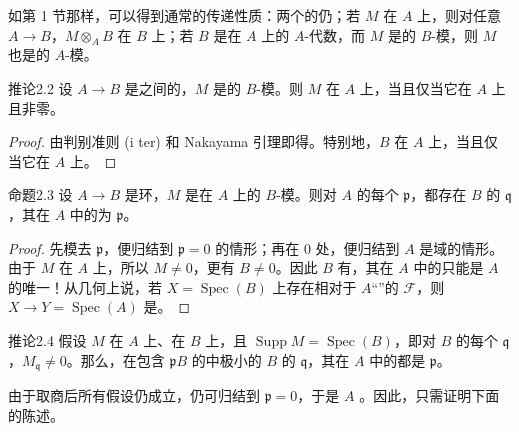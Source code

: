 如第 1 节那样，可以得到通常的传递性质：两个的仍；若 $M$ 在 $A$ 上，则对任意 $A\to B$，$M\otimes_A B$ 在 $B$ 上；若 $B$ 是在 $A$ 上的 $A$-代数，而 $M$ 是的 $B$-模，则 $M$ 也是的 $A$-模。

\begin{SGAresult}{推论}{2.2}
设 $A\to B$ 是之间的，$M$ 是的 $B$-模。则 $M$ 在 $A$ 上，当且仅当它在 $A$ 上且非零。
\end{SGAresult}
\begin{proof}
由判别准则 (i ter) 和 Nakayama 引理即得。特别地，$B$ 在 $A$ 上，当且仅当它在 $A$ 上。
\end{proof}

\begin{SGAresult}{命题}{2.3}
设 $A\to B$ 是环，$M$ 是在 $A$ 上的 $B$-模。则对 $A$ 的每个 $\mathfrak p$，都存在 $B$ 的 $\mathfrak q$，其在 $A$ 中的为 $\mathfrak p$。
\end{SGAresult}
\begin{proof}
先模去 $\mathfrak p$，便归结到 $\mathfrak p=0$ 的情形；再在 $0$ 处，便归结到 $A$ 是域的情形。由于 $M$ 在 $A$ 上，所以 $M\ne0$，更有 $B\ne0$。因此 $B$ 有，其在 $A$ 中的只能是 $A$ 的唯一！从几何上说，若 $X=\operatorname{Spec}(B)$ 上存在相对于 $A$“”的 $\mathcal F$，则 $X\to Y=\operatorname{Spec}(A)$ 是。
\end{proof}

\begin{SGAresult}{推论}{2.4}
假设 $M$ 在 $A$ 上、在 $B$ 上，且 $\operatorname{Supp}M=\operatorname{Spec}(B)$，即对 $B$ 的每个 $\mathfrak q$，$M_{\mathfrak q}\ne0$。那么，在包含 $\mathfrak pB$ 的中极小的 $B$ 的 $\mathfrak q$，其在 $A$ 中的都是 $\mathfrak p$。
\end{SGAresult}
由于取商后所有假设仍成立，仍可归结到 $\mathfrak p=0$，于是 $A$ 。因此，只需证明下面的陈述。

